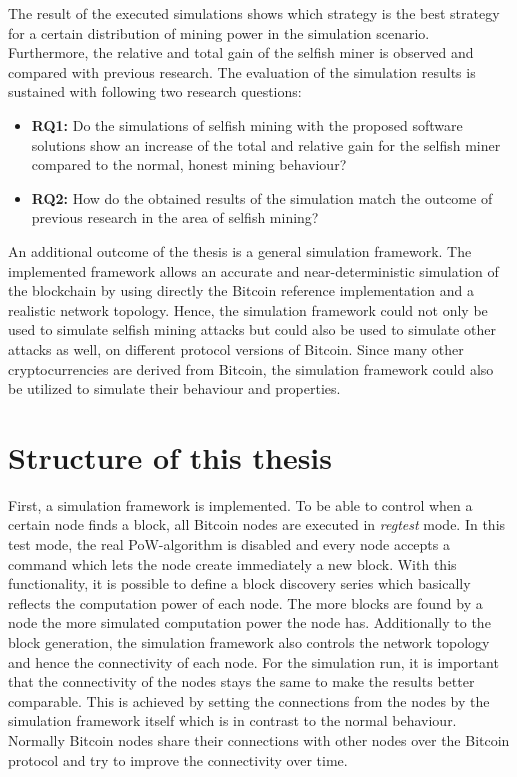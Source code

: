 The result of the executed simulations shows which strategy is the best strategy for a certain distribution of mining power in the simulation scenario.
Furthermore, the relative and total gain of the selfish miner is observed and compared with previous research.
The evaluation of the simulation results is sustained with following two research questions:

\begin{itemize}
	\item \textbf{RQ1:} Do the simulations of selfish mining with the proposed software solutions show an increase of the total and relative gain for the selfish miner compared to the normal, honest mining behaviour?

	\item \textbf{RQ2:} How do the obtained results of the simulation match the outcome of previous research in the area of selfish mining?
\end{itemize}


An additional outcome of the thesis is a general simulation framework.
The implemented framework allows an accurate and near-deterministic simulation of the blockchain by using directly the Bitcoin reference implementation and a realistic network topology.
Hence, the simulation framework could not only be used to simulate selfish mining attacks but could also be used to simulate other attacks as well, on different protocol versions of Bitcoin. 
Since many other cryptocurrencies are derived from Bitcoin, the simulation framework could also be utilized to simulate their behaviour and properties.

\section{Structure of this thesis}

First, a simulation framework is implemented.
To be able to control when a certain node finds a block, all Bitcoin nodes are executed in \textit{regtest} mode.
In this test mode, the real PoW-algorithm is disabled and every node accepts a command which lets the node create immediately a new block.
With this functionality, it is possible to define a block discovery series which basically reflects the computation power of each node.
The more blocks are found by a node the more simulated computation power the node has.
Additionally to the block generation, the simulation framework also controls the network topology and hence the connectivity of each node.
For the simulation run, it is important that the connectivity of the nodes stays the same to make the results better comparable.
This is achieved by setting the connections from the nodes by the simulation framework itself which is in contrast to the normal behaviour.
Normally Bitcoin nodes share their connections with other nodes over the Bitcoin protocol and try to improve the connectivity over time.

